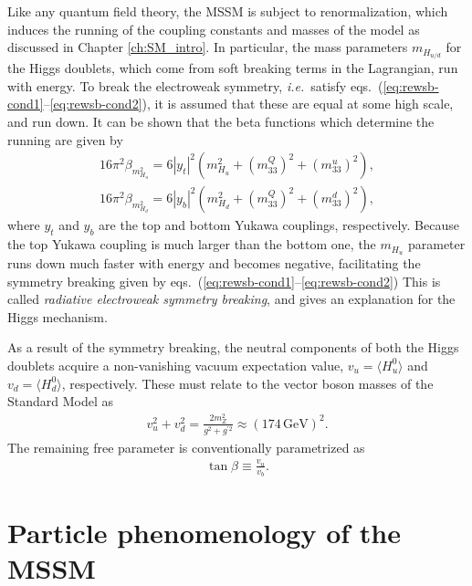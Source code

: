\documentclass[twoside,english]{uiofysmaster}
\begin{document}
Like any quantum field theory, the MSSM is subject to renormalization, which induces the running of the coupling constants and masses of the model as discussed in Chapter \ref{ch:SM_intro}. In particular, the mass parameters $m_{H_{u/d}}$ for the Higgs doublets, which come from soft breaking terms in the Lagrangian, run with energy. To break the electroweak symmetry, {\it i.e.}\ satisfy eqs.\ (\ref{eq:rewsb-cond1}--\ref{eq:rewsb-cond2}), it is assumed that these are equal at some high scale, and run down. It can be shown that the beta functions which determine the running are given by
\begin{align}
	16\pi^2 \beta_{m_{H_u}^2} = 6|y_t|^2\left( m_{H_u}^2 + ( m_{33}^Q)^2 + (m_{33}^u)^2 \right),\\
	16\pi^2 \beta_{m_{H_d}^2} = 6|y_b|^2\left( m_{H_d}^2 + ( m_{33}^Q)^2 + (m_{33}^d)^2 \right),
\end{align}
where $y_t$ and $y_b$ are the top and bottom Yukawa couplings, respectively. Because the top Yukawa coupling is much larger than the bottom one, the $m_{H_u}$ parameter runs down much faster with energy and becomes negative, facilitating the symmetry breaking given by eqs.\ (\ref{eq:rewsb-cond1}--\ref{eq:rewsb-cond2}) This is called {\it radiative electroweak symmetry breaking}, and gives an explanation for the Higgs mechanism.

As a result of the symmetry breaking, the neutral components of both the Higgs doublets acquire a non-vanishing vacuum expectation value, $v_u = \langle H_u^0 \rangle$ and $v_d = \langle H_d^0 \rangle$, respectively. These must relate to the vector boson masses of the Standard Model as
\begin{align}
	v_u^2 + v_d^2 = \frac{2m_Z^2}{g^2 + g^{'2}} \approx (174 \,\mathrm{GeV})^2.
\end{align}
The remaining free parameter is conventionally parametrized as
\begin{align}
	\tan \beta \equiv \frac{v_u}{v_b}.
\end{align}

\section{Particle phenomenology of the MSSM}
\end{document}
